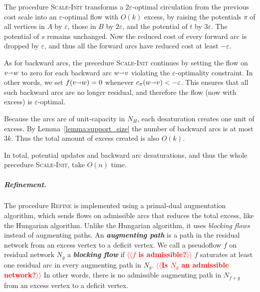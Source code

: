 \documentclass[a4paper,UKenglish]{socg-lipics-v2018}
\makeatletter
\def\note#1{\textcolor{red}{{#1}}}
\def\eps{\varepsilon}
\def\fsupply{\phi}
\def\arcto{\mathord\shortrightarrow}
\def\arc#1#2{#1\arcto#2}
\theoremstyle{plain}
\numberwithin{figure}{section}
\renewcommand{\paragraph}{\subparagraph}
\def\EMPH#1{\textbf{\emph{\boldmath #1}}}
\def\n@te#1{\textsf{\boldmath \textbf{$\langle\!\langle$#1$\rangle\!\rangle$}}\leavevmode}
\def\note#1{\textcolor{red}{\n@te{#1}}}
\makeatother
\begin{document}
The procedure \textsc{Scale-Init} transforms a $2\eps$-optimal circulation from the previous cost scale into an $\eps$-optimal flow with $O(k)$ excess, by raising the potentials $\pi$ of all vertices in $A$ by $\eps$, those in $B$ by $2\eps$, and the potential of $t$ by $3\eps$.  The potential of $s$ remains unchanged.
%
Now the reduced cost of every forward arc is dropped by $\eps$, and thus all the forward arcs have reduced cost at least $-\eps$.

As for backward arcs, the precedure \textsc{Scale-Init} continues by setting the flow on $\arc vw$ to zero for each backward arc $\arc wv$ violating the $\eps$-optimality constraint.  In other words, we set $f(\arc vw) = 0$ whenever $c_\pi(\arc wv) < -\eps$.  This ensures that all such backward arcs are no longer residual, and therefore the flow (now with excess) is $\eps$-optimal.

Because the arcs are of unit-capacity in $N_H$, each desaturation creates one unit of excess.
By Lemma~\ref{lemma:support_size} the number of backward arcs is at most $3k$.
Thus the total amount of excess created is also $O(k)$.

In total, potential updates and backward arc desaturations, and thus the whole precedure \textsc{Scale-Init}, take $O(n)$ time.


\paragraph{Refinement.}

The procedure \textsc{Refine} is implemented using a primal-dual augmentation algorithm,
which sends flows on admissible arcs that reduces the total excess, like the Hungarian algorithm.
Unlike the Hungarian algorithm,
it uses \emph{blocking flows} instead of augmenting paths.
%
An \EMPH{augmenting path} is a path in the residual network from an excess vertex to a deficit vertex.
We call a pseudoflow $f$ on residual network $N_g$ a \EMPH{blocking flow} if \note{$f$ is admissible?} $f$ saturates at least one residual arc in every augmenting path in $N_g$. \note{Is $N_g$ an admissible network?}
In other words, there is no admissible augmenting path in $N_{f+g}$ from an excess vertex to a deficit vertex.

\end{document}
